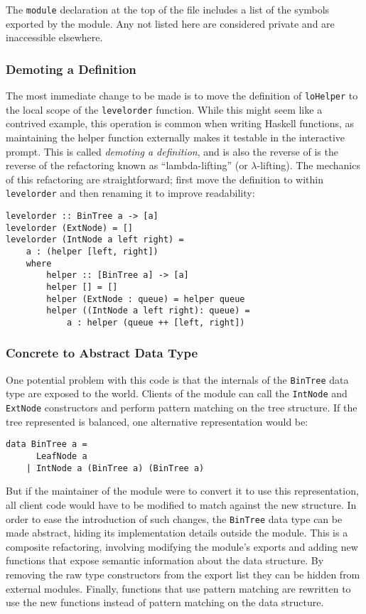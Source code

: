 The \verb!module! declaration at the top of the file includes a list of the symbols exported by the module.
Any not listed here are considered private and are inaccessible elsewhere.

\subsubsection{Demoting a Definition}

The most immediate change to be made is to move the definition of \verb!loHelper! to the local scope of the \verb!levelorder! function.  
While this might seem like a contrived example, this operation is common when writing Haskell functions, as maintaining the helper function externally makes it testable in the interactive prompt.
This is called \textit{demoting a definition}\cite{li2006refactoring}, and is also the reverse of  is the reverse of the refactoring known as ``lambda-lifting'' (or $\lambda$-lifting)\cite{haskellwikilifting}.
The mechanics of this refactoring are straightforward; first move the definition to within \verb!levelorder! and then renaming it to improve readability:

\begin{verbatim}
levelorder :: BinTree a -> [a]
levelorder (ExtNode) = []
levelorder (IntNode a left right) =
    a : (helper [left, right])
    where
        helper :: [BinTree a] -> [a]
        helper [] = []
        helper (ExtNode : queue) = helper queue
        helper ((IntNode a left right): queue) =
            a : helper (queue ++ [left, right])
\end{verbatim}

\subsubsection{Concrete to Abstract Data Type}

One potential problem with this code is that the internals of the \verb!BinTree! data type are exposed to the world.
Clients of the module can call the \verb!IntNode! and \verb!ExtNode! constructors and perform pattern matching on the tree structure.
If the tree represented is balanced, one alternative representation would be:

\begin{verbatim}
data BinTree a = 
      LeafNode a
    | IntNode a (BinTree a) (BinTree a)
\end{verbatim}

\noindent But if the maintainer of the module were to convert it to use this representation, all client code would have to be modified to match against the new structure\cite{thompson2005refactoring}.
In order to ease the introduction of such changes, the \verb!BinTree! data type can be made abstract, hiding its implementation details outside the module.
This is a composite refactoring, involving modifying the module's exports and adding new functions that expose semantic information about the data structure.
By removing the raw type constructors from the export list they can be hidden from external modules.
Finally, functions that use pattern matching are rewritten to use the new functions instead of pattern matching on the data structure.

